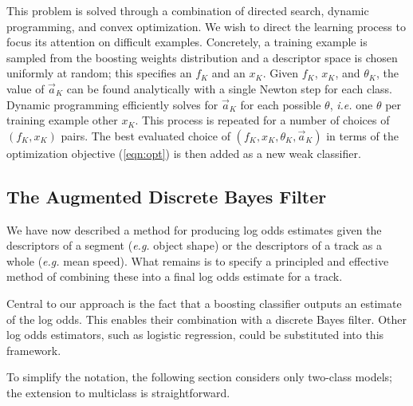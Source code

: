 \documentclass[letterpaper, 10 pt, conference]{ieeeconf}  %
\begin{document}
This problem is solved through a combination of directed search, dynamic programming, and convex optimization.  We wish to direct the learning process to focus its attention on difficult examples.  Concretely, a training example is sampled from the boosting weights distribution and a descriptor space is chosen uniformly at random; this specifies an $f_K$ and an $x_K$.  Given $f_K$, $x_K$, and $\theta_K$, the value of $\vec{a}_K$ can be found analytically with a single Newton step for each class.  Dynamic programming efficiently solves for $\vec{a}_K$ for each possible $\theta$, \textit{i.e.} one $\theta$ per training example other $x_K$.  This process is repeated for a number of choices of $(f_K, x_K)$ pairs.  The best evaluated choice of $(f_K, x_K, \theta_K, \vec{a}_K)$ in terms of the optimization objective (\ref{eqn:opt}) is then added as a new weak classifier.

\subsection{The Augmented Discrete Bayes Filter}
\label{sec:adbf}

We have now described a method for producing log odds estimates given the descriptors of a segment (\textit{e.g.} object shape) or the descriptors of a track as a whole (\textit{e.g.} mean speed).  What remains is to specify a principled and effective method of combining these into a final log odds estimate for a track.

Central to our approach is the fact that a boosting classifier outputs an estimate of the log odds.  This enables their combination with a discrete Bayes filter.  Other log odds estimators, such as logistic regression, could be substituted into this framework.

To simplify the notation, the following section considers only two-class models; the extension to multiclass is straightforward.
\end{document}
